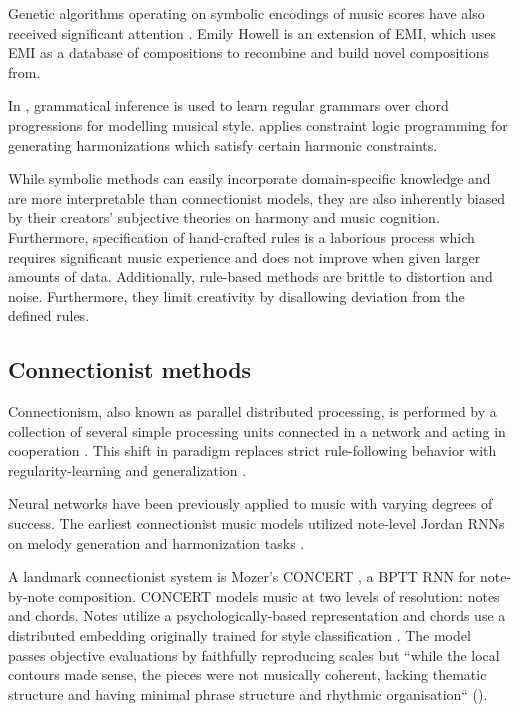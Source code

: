 
Genetic algorithms operating on symbolic encodings of music scores have also
received significant attention \citet{weinberg2007real,cope2010recombinant}.
Emily Howell\citep{cope2005computer} is an extension of EMI, which uses EMI as
a database of compositions to recombine and build novel compositions
from\cite{cope2010recombinant}.

In \citet{cruz1998learning}, grammatical inference is used to learn regular
grammars over chord progressions for modelling musical style.
\citet{tsang1991harmonizing} applies constraint logic programming for
generating harmonizations which satisfy certain harmonic constraints.

While symbolic methods can easily incorporate domain-specific knowledge and are
more interpretable than connectionist models, they are also inherently biased
by their creators' subjective theories on harmony and music cognition.
Furthermore, specification of hand-crafted rules is a laborious process which
requires significant music experience and does not improve when given larger
amounts of data. Additionally, rule-based methods are brittle to distortion and
noise. Furthermore, they limit creativity by disallowing deviation from the
defined rules.

\subsection{Connectionist methods}

Connectionism, also known as parallel distributed processing, is performed by a
collection of several simple processing units connected in a network and acting
in cooperation \citep{pdp1986parallel}. This shift in paradigm replaces strict
rule-following behavior with regularity-learning and generalization
\citep{dolson1989machine}.

Neural networks have been previously applied to music with varying degrees of
success\citep{griffith1999musical}. The earliest connectionist music models
utilized note-level Jordan RNNs on melody generation and harmonization tasks
\citep{todd1988sequential,todd1989connectionist,bharucha1989modeling}.

A landmark connectionist system is Mozer's CONCERT \citep{mozer1994neural}, a
BPTT RNN for note-by-note composition. CONCERT models music at two
levels of resolution: notes and chords. Notes utilize a psychologically-based
representation \citep{shepard1982geometrical} and chords use a distributed
embedding originally trained for style classification
\citep{laden1989representation}. The model passes objective evaluations by
faithfully reproducing scales but ``while the local contours made sense, the
pieces were not musically coherent, lacking thematic structure and having
minimal phrase structure and rhythmic organisation`` (\citet{mozer1994neural}).

